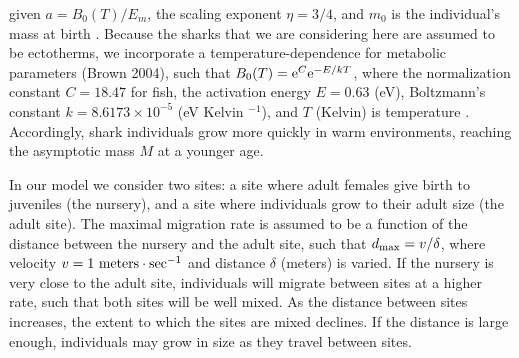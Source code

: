 \documentclass[]{rsos}%
\begin{document}
given $a=B_0(T)/E_m$, the scaling exponent $\eta = 3/4$, and $m_0$ is the individual's mass at birth \cite{Yeakel2018}. 
Because the sharks that we are considering here are assumed to be ectotherms, we incorporate a temperature-dependence for metabolic parameters (Brown 2004), such that $B_0(T) = {\rm e}^C{\rm e}^{-E/kT}$, where the normalization constant $C=18.47$ for fish, the activation energy $E=0.63$ (eV), Boltzmann's constant $k=8.6173\times 10^{-5}$ (eV Kelvin ${}^{-1}$), and $T$ (Kelvin) is temperature \cite{Brown2004}.
Accordingly, shark individuals grow more quickly in warm environments, reaching the asymptotic mass $M$ at a younger age.
 


In our model we consider two sites: a site where adult females give birth to juveniles (the nursery), and a site where individuals grow to their adult size (the adult site).
The maximal migration rate is assumed to be a function of the distance between the nursery and the adult site, such that $d_{\rm max} = v/\delta$, where velocity $v=1~{\rm meters}\cdot {\rm sec}^{-1}$ and distance $\delta$ (meters) is varied. 
If the nursery is very close to the adult site, individuals will migrate between sites at a higher rate, such that both sites will be well mixed.
As the distance between sites increases, the extent to which the sites are mixed declines.
If the distance is large enough, individuals may grow in size as they travel between sites.
\end{document}
